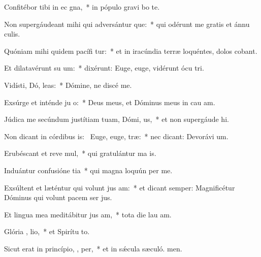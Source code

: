 \item Confitébor tibi in ec gna,~* in pópulo gravi bo te.
\item Non supergáudeant mihi qui adversántur  que:~* qui odérunt me gratis et ánnu culis.
\item Quóniam mihi quidem pacífi tur:~* et in iracúndia terræ loquéntes, dolos cobant.
\item Et dilatavérunt su   um:~* dixérunt: Euge, euge, vidérunt ócu tri.
\item Vidísti, Dó,  leas:~* Dómine, ne discé  me.
\item Exsúrge et inténde ju o:~* Deus meus, et Dóminus meus in cau am.
\item Júdica me secúndum justítiam tuam, Dómi,  us,~* et non supergáude hi.
\item Non dicant in córdibus is:~\pscross{} Euge, euge,  træ:~* nec dicant: Devorávi um.
\item Erubéscant et reve mul,~* qui gratulántur ma is.
\item Induántur confusióne  tia~* qui magna loquún per me.
\item Exsúltent et læténtur qui volunt jus am:~* et dicant semper: Magnificétur Dóminus qui volunt pacem ser jus.
\item Et lingua mea meditábitur jus am,~* tota die lau am.
\item Glória ,  lio,~* et Spirítu to.
\item Sicut erat in princípio,  ,  per,~* et in sǽcula sæculó. men.
